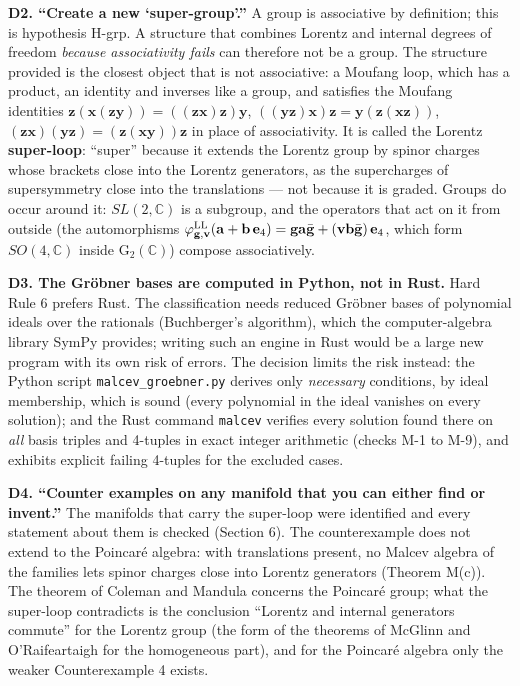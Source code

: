 \documentclass[
  10pt,
]{article}
\begin{document}
\textbf{D2. ``Create a new `super-group'.''} A group is associative by
definition; this is hypothesis H-grp. A structure that combines Lorentz
and internal degrees of freedom \emph{because associativity fails} can
therefore not be a group. The structure provided is the closest object
that is not associative: a Moufang loop, which has a product, an
identity and inverses like a group, and satisfies the Moufang identities
\(\mathbf z(\mathbf x(\mathbf z\mathbf y))=((\mathbf z\mathbf x)\mathbf z)\mathbf y\),
\(((\mathbf y\mathbf z)\mathbf x)\mathbf z=\mathbf y(\mathbf z(\mathbf x\mathbf z))\),
\((\mathbf z\mathbf x)(\mathbf y\mathbf z)=(\mathbf z(\mathbf x\mathbf y))\mathbf z\)
in place of associativity. It is called the Lorentz \textbf{super-loop}:
``super'' because it extends the Lorentz group by spinor charges whose
brackets close into the Lorentz generators, as the supercharges of
supersymmetry close into the translations --- not because it is graded.
Groups do occur around it: \(SL(2,\mathbb C)\) is a subgroup, and the
operators that act on it from outside (the automorphisms
\(\varphi^{\rm LL}_{\mathbf g,\mathbf v}(\mathbf a+\mathbf b\,\mathbf e_4)=\mathbf g\mathbf a\bar{\mathbf g}+(\mathbf v\mathbf b\bar{\mathbf g})\,\mathbf e_4\),
which form \(SO(4,\mathbb C)\) inside \(\mathrm G_2(\mathbb C)\))
compose associatively.

\textbf{D3. The Gröbner bases are computed in Python, not in Rust.} Hard
Rule 6 prefers Rust. The classification needs reduced Gröbner bases of
polynomial ideals over the rationals (Buchberger's algorithm), which the
computer-algebra library SymPy provides; writing such an engine in Rust
would be a large new program with its own risk of errors. The decision
limits the risk instead: the Python script \texttt{malcev\_groebner.py}
derives only \emph{necessary} conditions, by ideal membership, which is
sound (every polynomial in the ideal vanishes on every solution); and
the Rust command \texttt{malcev} verifies every solution found there on
\emph{all} basis triples and 4-tuples in exact integer arithmetic
(checks M-1 to M-9), and exhibits explicit failing 4-tuples for the
excluded cases.

\textbf{D4. ``Counter examples on any manifold that you can either find
or invent.''} The manifolds that carry the super-loop were identified
and every statement about them is checked (Section 6). The
counterexample does not extend to the Poincaré algebra: with
translations present, no Malcev algebra of the families lets spinor
charges close into Lorentz generators (Theorem M(c)). The theorem of
Coleman and Mandula concerns the Poincaré group; what the super-loop
contradicts is the conclusion ``Lorentz and internal generators
commute'' for the Lorentz group (the form of the theorems of McGlinn and
O'Raifeartaigh for the homogeneous part), and for the Poincaré algebra
only the weaker Counterexample 4 exists.
\end{document}

